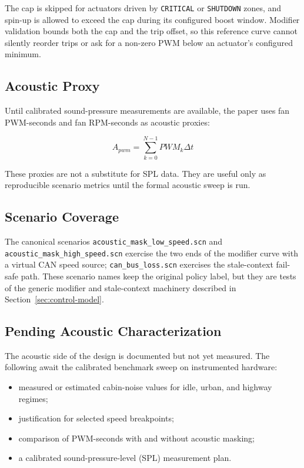 The cap is skipped for actuators driven by \texttt{CRITICAL} or \texttt{SHUTDOWN} zones, and spin-up is allowed to exceed the cap during its configured boost window. Modifier validation bounds both the cap and the trip offset, so this reference curve cannot silently reorder trips or ask for a non-zero PWM below an actuator's configured minimum.

\subsection{Acoustic Proxy}

Until calibrated sound-pressure measurements are available, the paper uses fan PWM-seconds and fan RPM-seconds as acoustic proxies:

\begin{equation}
    A_{pwm} = \sum_{k=0}^{N-1} PWM_k \Delta t
\end{equation}

These proxies are not a substitute for SPL data. They are useful only as reproducible scenario metrics until the formal acoustic sweep is run.

\subsection{Scenario Coverage}

The canonical scenarios \texttt{acoustic\_mask\_low\_speed.scn} and \texttt{acoustic\_mask\_high\_speed.scn} exercise the two ends of the modifier curve with a virtual CAN speed source; \texttt{can\_bus\_loss.scn} exercises the stale-context fail-safe path. These scenario names keep the original policy label, but they are tests of the generic modifier and stale-context machinery described in Section~\ref{sec:control-model}.

\subsection{Pending Acoustic Characterization}

The acoustic side of the design is documented but not yet measured. The following await the calibrated benchmark sweep on instrumented hardware:

\begin{itemize}[leftmargin=*]
    \item measured or estimated cabin-noise values for idle, urban, and highway regimes;
    \item justification for selected speed breakpoints;
    \item comparison of PWM-seconds with and without acoustic masking;
    \item a calibrated sound-pressure-level (SPL) measurement plan.
\end{itemize}

\endinput
